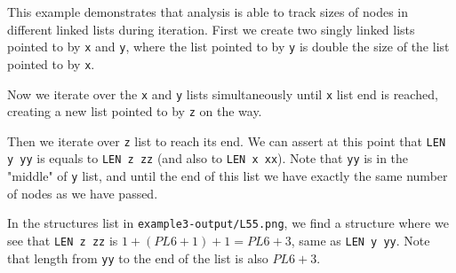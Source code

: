 This example demonstrates that analysis is able to track sizes of nodes in different linked lists during iteration. First we create two singly linked lists pointed to by \texttt{x} and \texttt{y}, where the list pointed to by \texttt{y} is double the size of the list pointed to by \texttt{x}.

Now we iterate over the \texttt{x} and \texttt{y} lists simultaneously until \texttt{x} list end is reached, creating a new list pointed to by \texttt{z} on the way.

Then we iterate over \texttt{z} list to reach its end. We can assert at this point that \texttt{LEN y yy} is equals to \texttt{LEN z zz} (and also to \texttt{LEN x xx}). Note that \texttt{yy} is in the "middle" of \texttt{y} list, and until the end of this list we have exactly the same number of nodes as we have passed.

In the structures list in \texttt{example3-output/L55.png}, we find a structure where we see that \texttt{LEN z zz} is $1+(PL6+1)+1=PL6+3$, same as \texttt{LEN y yy}. Note that length from \texttt{yy} to the end of the list is also $PL6+3$.
